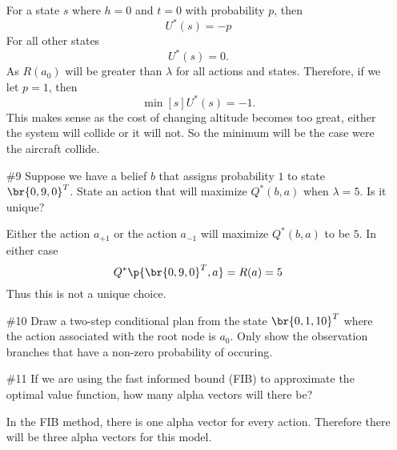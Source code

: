 \documentclass[12pt, oneside]{article}
\begin{document}
\begin{enumerate}
    For a state $s$ where $h = 0$ and $t = 0$ with probability $p$, then
    \[
      U^*(s) = -p
    \]
    For all other states
    \[
      U^*(s) = 0.
    \]
    As $R(a_0)$ will be greater than $\lambda$ for all actions and states.
    Therefore, if we let $p = 1$, then
    \[
      \min[s]{U^*(s)} = -1.
    \]
    This makes sense as the cost of changing altitude becomes too great, either
    the system will collide or it will not.
    So the minimum will be the case were the aircraft collide.

  \item[\#9] %
    Suppose we have a belief $b$ that assigns probability $1$ to state $\br{0, 9, 0}^T$.
    State an action that will maximize $Q^*(b, a)$ when $\lambda = 5$.
    Is it unique?

    Either the action $a_{+1}$ or the action $a_{-1}$ will maximize
    $Q^*(b, a)$ to be $5$.
    In either case
    \[
      Q^*\p{\br{0, 9, 0}^T, a} = R(a) = 5
    \]
    Thus this is not a unique choice.

  \item[\#10]
    Draw a two-step conditional plan from the state $\br{0, 1, 10}^T$ where the
    action associated with the root node is $a_0$.
    Only show the observation branches that have a non-zero probability of
    occuring.
    \begin{center}
    \end{center}

  \item[\#11] %
    If we are using the fast informed bound (FIB) to approximate the optimal
    value function, how many alpha vectors will there be?

    In the FIB method, there is one alpha vector for every action.
    Therefore there will be three alpha vectors for this model.


\end{enumerate}
\end{document}
